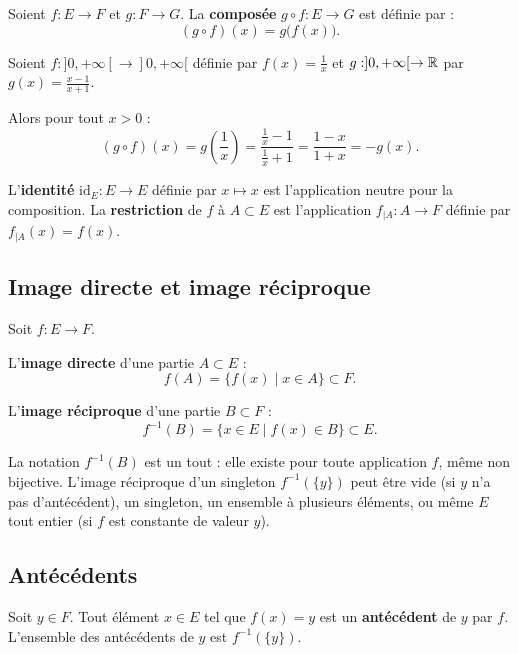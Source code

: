 \begin{defbox}[--- Composition]
Soient $f : E \to F$ et $g : F \to G$. La \textbf{composée} $g \circ f : E \to G$ est définie par :
\[(g \circ f)(x) = g\bigl(f(x)\bigr).\]
\end{defbox}

\begin{exbox}
Soient $f : ]0, +\infty[ \to ]0, +\infty[$ définie par $f(x) = \frac{1}{x}$ et $g : ]0, +\infty[ \to \mathbb{R}$ par $g(x) = \frac{x-1}{x+1}$.

Alors pour tout $x > 0$ :
\[
(g \circ f)(x) = g\!\left(\frac{1}{x}\right) = \frac{\frac{1}{x} - 1}{\frac{1}{x} + 1} = \frac{1 - x}{1 + x} = -g(x).
\]
\end{exbox}

L'\textbf{identité} $\mathrm{id}_E : E \to E$ définie par $x \mapsto x$ est l'application neutre pour la composition. La \textbf{restriction} de $f$ à $A \subset E$ est l'application $f_{|A} : A \to F$ définie par $f_{|A}(x) = f(x)$.


\subsection{Image directe et image réciproque}

\begin{defbox}
Soit $f : E \to F$.

\medskip
L'\textbf{image directe} d'une partie $A \subset E$ :
\[f(A) = \{f(x) \mid x \in A\} \subset F.\]

L'\textbf{image réciproque} d'une partie $B \subset F$ :
\[f^{-1}(B) = \{x \in E \mid f(x) \in B\} \subset E.\]
\end{defbox}

\begin{rembox}[Attention]
La notation $f^{-1}(B)$ est un tout : elle existe pour toute application $f$, même non bijective. L'image réciproque d'un singleton $f^{-1}(\{y\})$ peut être vide (si $y$ n'a pas d'antécédent), un singleton, un ensemble à plusieurs éléments, ou même $E$ tout entier (si $f$ est constante de valeur $y$).
\end{rembox}


\subsection{Antécédents}

\begin{defbox}[--- Antécédent]
Soit $y \in F$. Tout élément $x \in E$ tel que $f(x) = y$ est un \textbf{antécédent} de $y$ par $f$. L'ensemble des antécédents de $y$ est $f^{-1}(\{y\})$.
\end{defbox}


